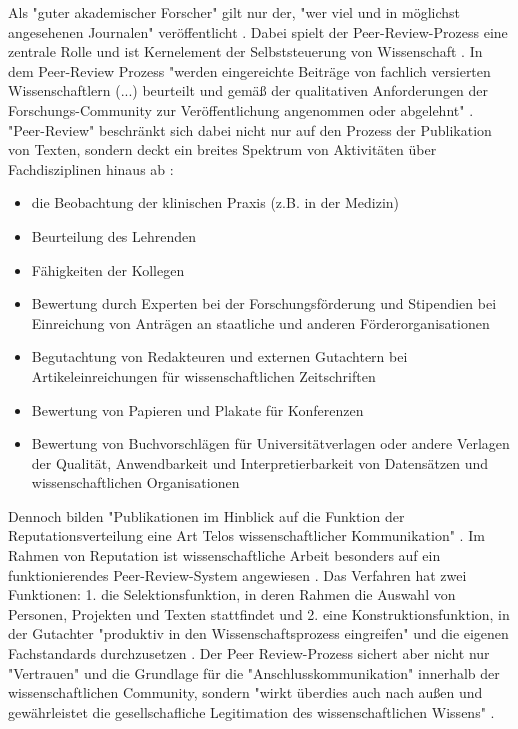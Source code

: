 Als "guter akademischer Forscher" gilt nur der, "wer viel und in möglichst angesehenen Journalen" veröffentlicht \cite{Frey_2005}. Dabei spielt der Peer-Review-Prozess eine zentrale Rolle und ist Kernelement der Selbststeuerung von Wissenschaft \cite{Neidhardt_2010}. In dem Peer-Review Prozess "werden eingereichte Beiträge von fachlich versierten Wissenschaftlern (...) beurteilt und gemäß der qualitativen Anforderungen der Forschungs-Community zur Veröffentlichung angenommen oder abgelehnt" \cite{Hess_2006}. "Peer-Review" beschränkt sich dabei nicht nur auf den Prozess der Publikation von Texten, sondern deckt ein breites Spektrum von Aktivitäten über Fachdisziplinen hinaus ab \cite{Lee_2012}: 
\begin{itemize}
\item die Beobachtung der klinischen Praxis (z.B. in der Medizin)
\item Beurteilung des Lehrenden
\item Fähigkeiten der Kollegen
\item Bewertung durch Experten bei der Forschungsförderung und Stipendien bei Einreichung von Anträgen an staatliche und anderen Förderorganisationen
\item Begutachtung von Redakteuren und externen Gutachtern bei Artikeleinreichungen für wissenschaftlichen Zeitschriften
\item Bewertung von Papieren und Plakate für Konferenzen
\item Bewertung von Buchvorschlägen für Universitätverlagen oder andere Verlagen
 der Qualität, Anwendbarkeit und Interpretierbarkeit von Datensätzen und wissenschaftlichen Organisationen
\end{itemize} Dennoch bilden "Publikationen im Hinblick auf die Funktion der Reputationsverteilung eine Art Telos wissenschaftlicher Kommunikation" \cite{hirschauer2004peer}. Im Rahmen von Reputation ist wissenschaftliche Arbeit besonders auf ein funktionierendes Peer-Review-System angewiesen \cite{suchen}. Das Verfahren hat zwei Funktionen: 1. die Selektionsfunktion, in deren Rahmen die Auswahl von Personen, Projekten und Texten stattfindet und 2. eine Konstruktionsfunktion, in der Gutachter "produktiv in den Wissenschaftsprozess eingreifen" und die eigenen Fachstandards durchzusetzen \cite{Neidhardt_2010}. Der Peer Review-Prozess sichert aber nicht nur "Vertrauen" und die Grundlage für die "Anschlusskommunikation" innerhalb der wissenschaftlichen Community, sondern "wirkt überdies auch nach außen und gewährleistet die gesellschafliche Legitimation des wissenschaftlichen Wissens" \cite{pscheida_2010_wikipedia}.


